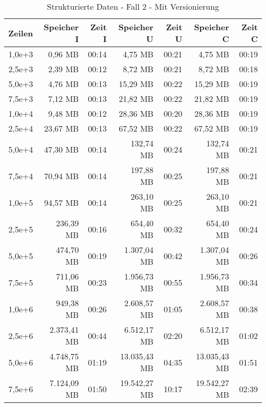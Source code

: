 \begin{table}
    \centering
    \begin{tabular}{|r|r|r|r|r|r|r|}
        \hline
        \textbf{Zeilen} & \textbf{Speicher I} & \textbf{Zeit I} & \textbf{Speicher U} & \textbf{Zeit U} & \textbf{Speicher C} & \textbf{Zeit C} \\ \hline
        1,0e+3  & 0,96 MB       & 00:14 & 4,75 MB       & 00:21 & 4,75 MB       & 00:19 \\ \hline
        2,5e+3  & 2,39 MB       & 00:12 & 8,72 MB       & 00:21 & 8,72 MB       & 00:18 \\ \hline
        5,0e+3  & 4,76 MB       & 00:13 & 15,29 MB      & 00:22 & 15,29 MB      & 00:19 \\ \hline
        7,5e+3  & 7,12 MB       & 00:13 & 21,82 MB      & 00:22 & 21,82 MB      & 00:19 \\ \hline
        1,0e+4  & 9,48 MB       & 00:12 & 28,36 MB      & 00:20 & 28,36 MB      & 00:19 \\ \hline
        2,5e+4  & 23,67 MB      & 00:13 & 67,52 MB      & 00:22 & 67,52 MB      & 00:19 \\ \hline
        5,0e+4  & 47,30 MB      & 00:14 & 132,74 MB     & 00:24 & 132,74 MB     & 00:21 \\ \hline
        7,5e+4  & 70,94 MB      & 00:14 & 197,88 MB     & 00:25 & 197,88 MB     & 00:21 \\ \hline
        1,0e+5  & 94,57 MB      & 00:14 & 263,10 MB     & 00:25 & 263,10 MB     & 00:21 \\ \hline
        2,5e+5  & 236,39 MB     & 00:16 & 654,40 MB     & 00:32 & 654,40 MB     & 00:24 \\ \hline
        5,0e+5  & 474,70 MB     & 00:19 & 1.307,04 MB   & 00:42 & 1.307,04 MB   & 00:26 \\ \hline
        7,5e+5  & 711,06 MB     & 00:23 & 1.956,73 MB   & 00:55 & 1.956,73 MB   & 00:34 \\ \hline
        1,0e+6  & 949,38 MB     & 00:26 & 2.608,57 MB   & 01:05 & 2.608,57 MB   & 00:38 \\ \hline
        2,5e+6  & 2.373,41 MB   & 00:44 & 6.512,17 MB   & 02:20 & 6.512,17 MB   & 01:02 \\ \hline
        5,0e+6  & 4.748,75 MB   & 01:19 & 13.035,43 MB  & 04:35 & 13.035,43 MB  & 01:51 \\ \hline
        7,5e+6  & 7.124,09 MB   & 01:50 & 19.542,27 MB  & 10:17 & 19.542,27 MB  & 02:39 \\ \hline
    \end{tabular}
    \caption{Strukturierte Daten - Fall 2 - Mit Versionierung}
\end{table}

